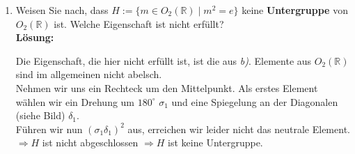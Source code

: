 \documentclass[11pt,a4paper,ngerman]{article}
\newcommand{\R}{\mathbb{R}}
\begin{document}
\begin{enumerate}[\bfseries a)]
\item Weisen Sie nach, dass $H := \{ m \in O_2 (\R ) \; | \; m^2 = e \}$ keine \textbf{Untergruppe} von $O_2 (\R ) $ ist. Welche Eigenschaft ist nicht erfüllt?\\

\textbf{Lösung:}

Die Eigenschaft, die hier nicht erfüllt ist, ist die aus \emph{b)}. Elemente aus $O_2 (\R)$ sind im allgemeinen nicht abelsch.\\
Nehmen wir uns ein Rechteck um den Mittelpunkt. Als erstes Element wählen wir ein Drehung um $180^\circ$ $\sigma_1$ und eine Spiegelung an der Diagonalen (siehe Bild) $\delta_1$.\\

Führen wir nun $(\sigma_1 \delta_1)^2$ aus, erreichen wir leider nicht das neutrale Element.\\

$\Rightarrow H$ ist nicht abgeschlossen $\Rightarrow H$ ist keine Untergruppe. 

\end{enumerate}

\label{LastPage}
\end{document}

